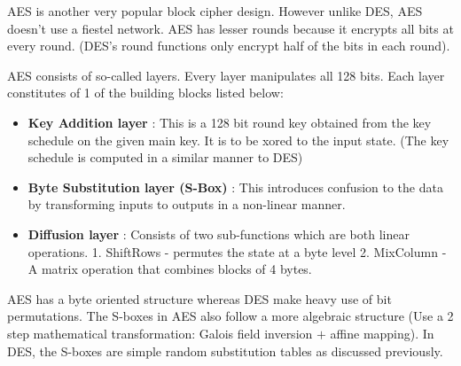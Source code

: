 AES is another very popular block cipher design. However unlike DES, AES doesn't use a fiestel network. AES has lesser rounds because it encrypts all  bits at every round. (DES's round functions only encrypt half of the bits in each round). 

AES consists of so-called layers. Every layer manipulates all 128 bits. Each layer constitutes of 1 of the building blocks listed below: \newline

\begin{itemize}
\item \textbf{Key Addition layer} : This is a 128 bit round key obtained from the key schedule on the given main key. It is to be xored to the input state. (The key schedule is computed in a similar manner to DES)
\item \textbf{Byte Substitution layer (S-Box)} : This introduces confusion to the data by transforming inputs to outputs in a non-linear manner.
\item \textbf{Diffusion layer} : Consists of two sub-functions which are both linear operations. 1. ShiftRows - permutes the state at a byte level 2. MixColumn - A matrix operation that combines blocks of 4 bytes.
\end{itemize}

AES has a byte oriented structure whereas DES make heavy use of bit permutations. The S-boxes in AES also follow a more algebraic structure (Use a 2 step mathematical transformation: Galois field inversion $+$ affine mapping). In DES, the S-boxes are simple random substitution tables as discussed previously. \newline



